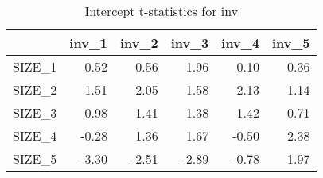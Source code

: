 \begin{table}[ht]
\centering
\caption{Intercept t-statistics for inv} 
\begin{tabular}{rrrrrr}
  \hline
 & inv\_1 & inv\_2 & inv\_3 & inv\_4 & inv\_5 \\ 
  \hline
SIZE\_1 & 0.52 & 0.56 & 1.96 & 0.10 & 0.36 \\ 
  SIZE\_2 & 1.51 & 2.05 & 1.58 & 2.13 & 1.14 \\ 
  SIZE\_3 & 0.98 & 1.41 & 1.38 & 1.42 & 0.71 \\ 
  SIZE\_4 & -0.28 & 1.36 & 1.67 & -0.50 & 2.38 \\ 
  SIZE\_5 & -3.30 & -2.51 & -2.89 & -0.78 & 1.97 \\ 
   \hline
\end{tabular}
\end{table}


